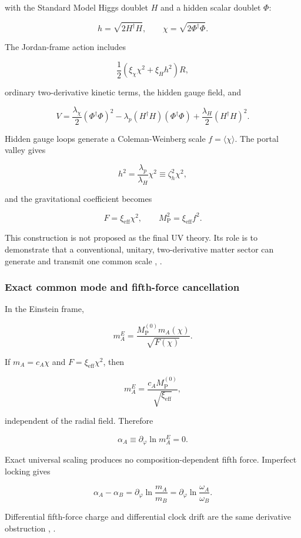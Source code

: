 \documentclass[
]{article}
\begin{document}
with the Standard Model Higgs doublet \(H\) and a hidden scalar doublet
\(\Phi\):

\[
h=\sqrt{2H^\dagger H},
\qquad
\chi=\sqrt{2\Phi^\dagger\Phi}.
\]

The Jordan-frame action includes

\[
\frac12(\xi_\chi\chi^2+\xi_Hh^2)R,
\]

ordinary two-derivative kinetic terms, the hidden gauge field, and

\[
V
=\frac{\lambda_\chi}{2}(\Phi^\dagger\Phi)^2
-\lambda_p(H^\dagger H)(\Phi^\dagger\Phi)
+\frac{\lambda_H}{2}(H^\dagger H)^2.
\]

Hidden gauge loops generate a Coleman-Weinberg scale
\(f=\langle\chi\rangle\). The portal valley gives

\[
h^2=\frac{\lambda_p}{\lambda_H}\chi^2
\equiv\zeta_h^2\chi^2,
\]

and the gravitational coefficient becomes

\[
F=\xi_{\mathrm{eff}}\chi^2,
\qquad
M_{\mathrm{P}}^2=\xi_{\mathrm{eff}}f^2.
\]

This construction is not proposed as the final UV theory. Its role is to
demonstrate that a conventional, unitary, two-derivative matter sector
can generate and transmit one common scale
,
.

\subsubsection{Exact common mode and fifth-force
cancellation}\label{exact-common-mode-and-fifth-force-cancellation}

In the Einstein frame,

\[
m_A^E=\frac{M_{\mathrm{P}}^{(0)}m_A(\chi)}{\sqrt{F(\chi)}}.
\]

If \(m_A=c_A\chi\) and \(F=\xi_{\mathrm{eff}}\chi^2\), then

\[
m_A^E=\frac{c_AM_{\mathrm{P}}^{(0)}}{\sqrt{\xi_{\mathrm{eff}}}},
\]

independent of the radial field. Therefore

\[
\alpha_A\equiv\partial_\varphi\ln m_A^E=0.
\]

Exact universal scaling produces no composition-dependent fifth force.
Imperfect locking gives

\[
\alpha_A-\alpha_B
=\partial_\varphi\ln\frac{m_A}{m_B}
=\partial_\varphi\ln\frac{\omega_A}{\omega_B}.
\]

Differential fifth-force charge and differential clock drift are the
same derivative obstruction
,
.
\end{document}
